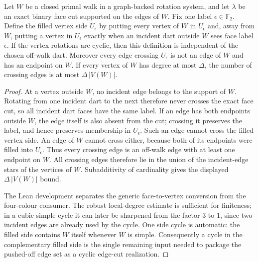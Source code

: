 \begin{lemma}
\label{lem:exact-cycle-cut-push-off}
Let $W$ be a closed primal walk in a graph-backed rotation system, and let
$\lambda$ be an exact binary face cut supported on the edges of $W$.  Fix one
label $\epsilon\in\mathbb F_2$.  Define the filled vertex side $U_\epsilon$
by putting every vertex of $W$ in $U_\epsilon$ and, away from $W$, putting a
vertex in $U_\epsilon$ exactly when an incident dart outside $W$ sees face
label $\epsilon$.  If the vertex rotations are cyclic, then this definition
is independent of the chosen off-walk dart.  Moreover every edge crossing
$U_\epsilon$ is not an edge of $W$ and has an endpoint on $W$.  If every
vertex of $W$ has degree at most $\Delta$, the number of crossing edges is at
most $\Delta\,|V(W)|$.
\end{lemma}

\begin{proof}
At a vertex outside $W$, no incident edge belongs to the support of $W$.
Rotating from one incident dart to the next therefore never crosses the exact
face cut, so all incident dart faces have the same label.  If an edge has
both endpoints outside $W$, the edge itself is also absent from the cut;
crossing it preserves the label, and hence preserves membership in
$U_\epsilon$.  Such an edge cannot cross the filled vertex side.  An edge of
$W$ cannot cross either, because both of its endpoints were filled into
$U_\epsilon$.  Thus every crossing edge is an off-walk edge with at least one
endpoint on $W$.  All crossing edges therefore lie in the union of the
incident-edge stars of the vertices of $W$.  Subadditivity of cardinality
gives the displayed $\Delta\,|V(W)|$ bound.

The Lean development separates the generic face-to-vertex conversion from
the four-colour consumer.  The robust local-degree estimate is sufficient
for finiteness; in a cubic simple cycle it can later be sharpened from the
factor $3$ to $1$, since two incident edges are already used by the cycle.
One side cycle is automatic: the filled side contains $W$ itself whenever
$W$ is simple.  Consequently a cycle in the complementary filled side is the
single remaining input needed to package the pushed-off edge set as a cyclic
edge-cut realization.
\end{proof}

